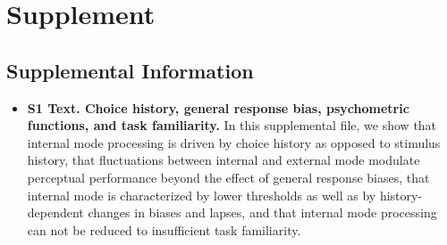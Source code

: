 \documentclass[
]{article}
\begin{document}
\newpage
\hypertarget{Supplement}{%
\section*{Supplement}\label{Supplement}}

\subsection*{{Supplemental Information}\label{Supplemental Information}}

\begin{itemize}
\item \textbf{S1 Text. Choice history, general response bias, psychometric functions, and task familiarity.} In this supplemental file, we show that internal mode processing is driven by choice history as opposed to stimulus history, that fluctuations between internal and external mode modulate perceptual performance beyond the effect of general response biases, that internal mode is characterized by lower thresholds as well as by history-dependent changes in biases and lapses, and that internal mode processing can not be reduced to insufficient task familiarity.
\end{itemize}
 
\end{document}
